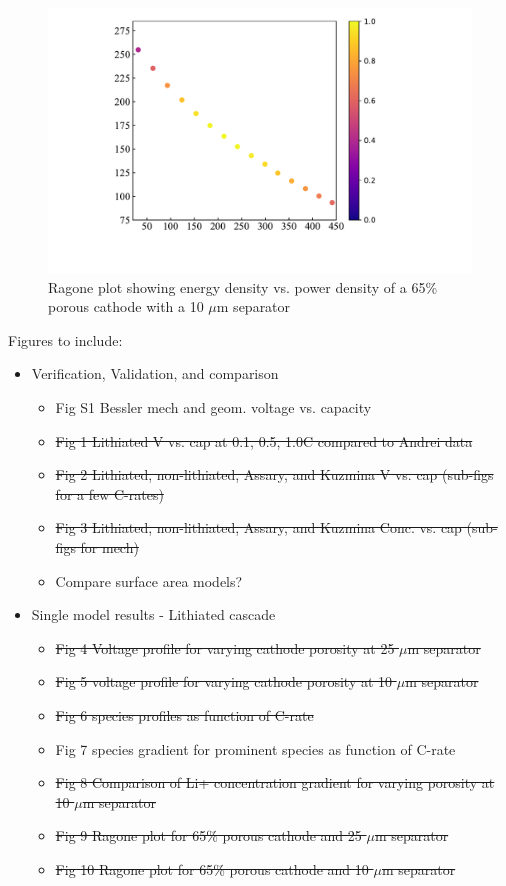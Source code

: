 \documentclass{elsarticle}
\begin{document}
\begin{figure}
    \centering
    \includegraphics[width=\textwidth]{Figures/Ragone_65pct10um.pdf}
    \caption{Ragone plot showing energy density vs. power density of a 65\% porous cathode with a 10 $\mu$m separator}
    \label{fig:ragone10umsep}
\end{figure}

\newpage

Figures to include:
\begin{itemize}
        \item Verification, Validation, and comparison
        \begin{itemize}
        \item Fig S1 Bessler mech and geom. voltage vs. capacity
        \item \sout{Fig 1 Lithiated V vs. cap at 0.1, 0.5, 1.0C compared to Andrei data}
        \item \sout{Fig 2 Lithiated, non-lithiated, Assary, and Kuzmina V vs. cap (sub-figs for a few C-rates)}
        \item \sout{Fig 3 Lithiated, non-lithiated, Assary, and Kuzmina Conc. vs. cap (sub-figs for mech)}
        \item Compare surface area models?
    \end{itemize}
    \item Single model results - Lithiated cascade
    \begin{itemize}
        \item \sout{Fig 4 Voltage profile for varying cathode porosity at 25 $\mu$m separator}
        \item \sout{Fig 5 voltage profile for varying cathode porosity at 10 $\mu$m separator}
        \item \sout{Fig 6 species profiles as function of C-rate}
        \item Fig 7 species gradient for prominent species as function of C-rate
        \item \sout{Fig 8 Comparison of Li+ concentration gradient for varying porosity at 10 $\mu$m separator}
        \item \sout{Fig 9 Ragone plot for 65\% porous cathode and 25 $\mu$m separator}
        \item \sout{Fig 10 Ragone plot for 65\% porous cathode and 10 $\mu$m separator}
    \end{itemize}
\end{itemize}
\end{document}
